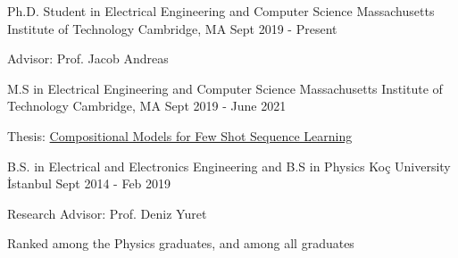 

\begin{cventries}

   \cventry
    {Ph.D. Student in Electrical Engineering and Computer Science} %
    {Massachusetts Institute of Technology} %
    {Cambridge, MA} %
    {Sept 2019 - Present} %
    {
      \begin{cvitems} %
        \item {Advisor: Prof. Jacob Andreas}
      \end{cvitems}
    }

    \cventry
    {M.S in Electrical Engineering and Computer Science} %
    {Massachusetts Institute of Technology} %
    {Cambridge, MA} %
    {Sept 2019 - June 2021} %
    {
    \begin{cvitems}
    \item Thesis: \href{https://dspace.mit.edu/handle/1721.1/139493}{Compositional Models for Few Shot Sequence Learning}
    \end{cvitems}
    }

  \cventry
    {B.S. in Electrical and Electronics Engineering and B.S in Physics} %
    {Koç University} %
    {İstanbul} %
    {Sept 2014 - Feb 2019} %
    {
      \begin{cvitems} %
        \item {Research Advisor: Prof. Deniz Yuret}
        \item {Ranked   among the Physics graduates, and  among all graduates}
      \end{cvitems}
    }


\end{cventries}
